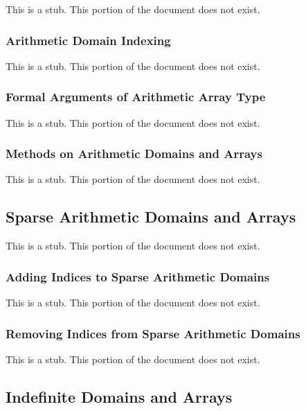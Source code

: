 This is a stub.  This portion of the document does not exist.

\subsubsection{Arithmetic Domain Indexing}
\label{Arithmetic_Domain_Indexing}

This is a stub.  This portion of the document does not exist.

\subsubsection{Formal Arguments of Arithmetic Array Type}
\label{Formal_Arguments_of_Arithmetic_Array_Type}

This is a stub.  This portion of the document does not exist.

\subsubsection{Methods on Arithmetic Domains and Arrays}
\label{Methods_on_Arithmetic_Domains_and_Arrays}

This is a stub.  This portion of the document does not exist.

\subsection{Sparse Arithmetic Domains and Arrays}
\label{Sparse_Arithmetic_Domains_and_Arrays}

This is a stub.  This portion of the document does not exist.

\subsubsection{Adding Indices to Sparse Arithmetic Domains}
\label{Adding_Indices_to_Sparse_Arithmetic_Domains}

This is a stub.  This portion of the document does not exist.

\subsubsection{Removing Indices from Sparse Arithmetic Domains}
\label{Removing_Indices_from_Sparse_Arithmetic_Domains}

This is a stub.  This portion of the document does not exist.

\subsection{Indefinite Domains and Arrays}
\label{Indefinite_Domains_and_Arrays}

